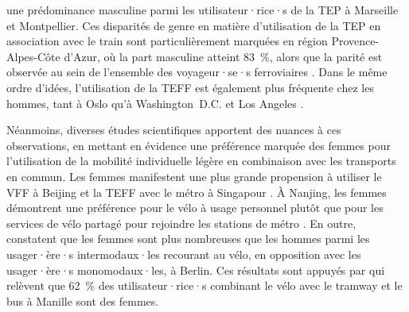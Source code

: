\begin{refsegment}
une prédominance masculine parmi les utilisateur·rice·s de la \acrshort{TEP} à Marseille et Montpellier. Ces disparités de genre en matière d'utilisation de la \acrshort{TEP} en association avec le train sont particulièrement marquées en région Provence-Alpes-Côte d'Azur, où la part masculine atteint 83~\%, alors que la parité est observée au sein de l'ensemble des voyageur·se·s ferroviaires \textcolor{blue}{\autocite[183]{moinse_intermodal_2022}}. Dans le même ordre d'idées, l'utilisation de la \acrshort{TEFF} est également plus fréquente chez les hommes, tant à Oslo \textcolor{blue}{\autocite[3]{fearnley_patterns_2020}} qu'à Washington~D.C. et Los Angeles \textcolor{blue}{\autocite[5]{yan_evaluating_2023}}.%

Néanmoins, diverses études scientifiques apportent des nuances à ces observations, en mettant en évidence une préférence marquée des femmes pour l'utilisation de la mobilité individuelle légère en combinaison avec les transports en commun. Les femmes manifestent une plus grande propension à utiliser le \acrshort{VFF} à Beijing \textcolor{blue}{\autocite[6]{guo_exploring_2023}} et la \acrshort{TEFF} avec le métro à Singapour \textcolor{blue}{\autocite[182]{cao_e-scooter_2021}}. À Nanjing, les femmes démontrent une préférence pour le vélo à usage personnel plutôt que pour les services de vélo partagé pour rejoindre les stations de métro \textcolor{blue}{\autocite[17]{ji_public_2017}}. En outre, \textcolor{blue}{\textcite[79]{oostendorp_combining_2018}} constatent que les femmes sont plus nombreuses que les hommes parmi les usager·ère·s intermodaux·les recourant au vélo, en opposition avec les usager·ère·s monomodaux·les, à Berlin. Ces résultats sont appuyés par \textcolor{blue}{\textcite[245]{fillone_i_2018}} qui relèvent que 62~\% des utilisateur·rice·s combinant le vélo avec le tramway et le bus à Manille sont des femmes.%
    

\end{refsegment}
